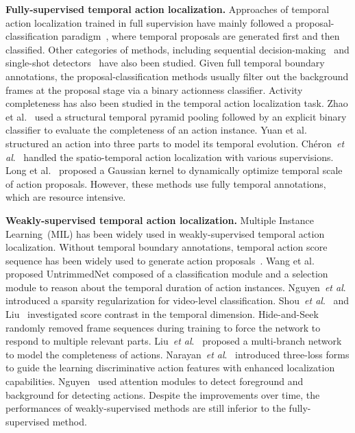 \documentclass[runningheads]{llncs}
\def\etal{\emph{et al}.}
\begin{document}
	
	\noindent\textbf{Fully-supervised temporal action localization.}
	Approaches of temporal action localization trained in full supervision have mainly followed a proposal-classification paradigm~\cite{chao2018rethinking,dai2017temporal,gao2017cascaded,lin2018bsn,Shou_2016_CVPR,Shou_2017_CVPR}, where temporal proposals are generated first and then classified. 
	Other categories of methods, including sequential decision-making~\cite{alwassel2018action}  and single-shot detectors~\cite{lin2017single} have also been studied.
	Given full temporal boundary annotations, the proposal-classification methods usually filter out the background frames at the proposal stage via a binary actionness classifier. 
	Activity completeness has also been studied in the temporal action localization task.
	Zhao et al.~\cite{zhao2017temporal} used a structural temporal pyramid pooling followed by an explicit binary classifier to evaluate the completeness of an action instance. 
	Yuan et al.~\cite{yuan2017temporal} structured an action into three parts to model its temporal evolution.
	Ch{\'e}ron~\etal~\cite{cheron2018flexible} handled the spatio-temporal action localization with various supervisions.
	Long et al.~\cite{long2019gaussian} proposed a Gaussian kernel to dynamically optimize temporal scale of action proposals. 
	However, these methods use fully temporal annotations, which are resource intensive.
	
	
	\noindent\textbf{Weakly-supervised temporal action localization.} 
	Multiple Instance Learning~(MIL) has been widely used in weakly-supervised temporal action localization. 
	Without temporal boundary annotations, temporal action score sequence has been widely used to generate action proposals~\cite{wang2017untrimmednets,nguyen2018weakly,Liu_2019_CVPR,Narayan_2019_ICCV}.
	Wang et al.~\cite{wang2017untrimmednets} proposed UntrimmedNet composed of a classification module and a selection module to reason about the temporal duration of action instances.
	Nguyen~\etal~\cite{nguyen2018weakly} introduced a sparsity regularization for video-level classification.
	Shou~\etal~\cite{shou2018autoloc} and Liu~\cite{liu2019weakly} investigated score contrast in the temporal dimension.
	Hide-and-Seek~\cite{singh2017hide} randomly removed frame sequences during training to force the network to respond to multiple relevant parts.
	Liu~\etal~\cite{Liu_2019_CVPR} proposed a multi-branch network to model the completeness of actions.
	Narayan~\etal~\cite{Narayan_2019_ICCV} introduced three-loss forms to guide the learning discriminative action features with enhanced localization capabilities.
	Nguyen~\cite{Nguyen_2019_ICCV} used attention modules to detect foreground and background for detecting actions.
	Despite the improvements over time, the performances of weakly-supervised methods are still inferior to the fully-supervised method.
	
\end{document}
